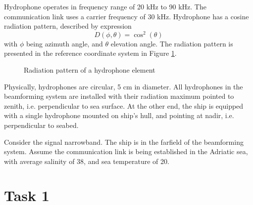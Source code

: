 \documentclass{article}[a4paper]
\begin{document}
Hydrophone operates in frequency range of 20 kHz to 90 kHz. The communication link uses a carrier frequency of 30 kHz. Hydrophone has a cosine radiation pattern, described by expression
\[ D(\phi,\theta) = \cos^2(\theta) \]
with $\phi$ being azimuth angle, and $\theta$ elevation angle. The radiation pattern is presented in the reference coordinate system in Figure \ref{fig:hydrophone}.
\begin{figure}[h!]
   \centering
   \hfill
   \caption{Radiation pattern of a hydrophone element}
   \label{fig:hydrophone}
\end{figure}
Physically, hydrophones are circular, 5 cm in diameter. All hydrophones in the beamforming system are installed with their radiation maximum pointed to zenith, i.e. perpendicular to sea surface. At the other end, the ship is equipped with a single hydrophone mounted on ship's hull, and pointing at nadir, i.e. perpendicular to seabed.

Consider the signal narrowband. The ship is in the farfield of the beamforming system. Assume the communication link is being established in the Adriatic sea, with average salinity of 38\textperthousand, and sea temperature of 20\textdegree.

\pagebreak

\section*{Task 1}
\end{document}
